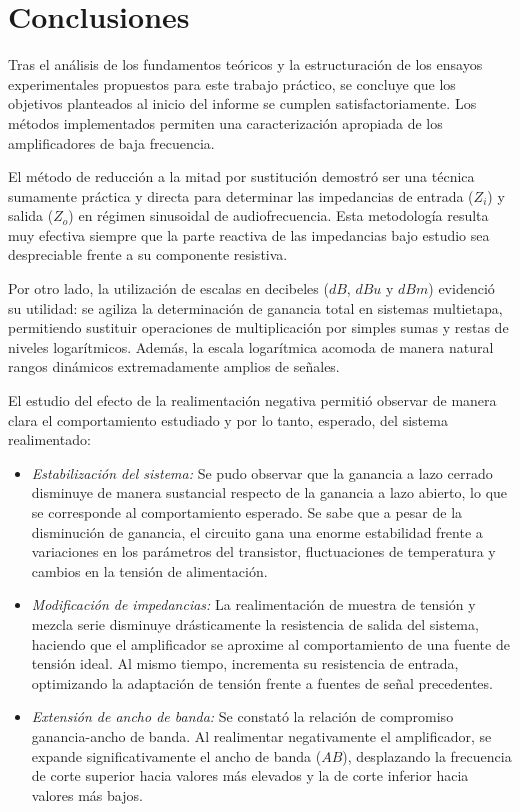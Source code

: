 \chapter{Conclusiones}
\label{chap:conclusiones}

Tras el análisis de los fundamentos teóricos y la estructuración de los ensayos experimentales propuestos para
este trabajo práctico, se concluye que los objetivos planteados al inicio del informe se cumplen satisfactoriamente.
Los métodos implementados permiten una caracterización apropiada de los amplificadores de baja frecuencia.

El método de reducción a la mitad por sustitución demostró ser una técnica sumamente práctica y directa para determinar
las impedancias de entrada ($Z_i$) y salida ($Z_o$) en régimen sinusoidal de audiofrecuencia. Esta metodología resulta
muy efectiva siempre que la parte reactiva de las impedancias bajo estudio sea despreciable frente a su componente resistiva.

Por otro lado, la utilización de escalas en decibeles ($dB$, $dBu$ y $dBm$)
evidenció su utilidad: se agiliza la determinación de ganancia total en sistemas multietapa, permitiendo
sustituir operaciones de multiplicación por simples sumas y restas de niveles logarítmicos. Además, la escala
logarítmica acomoda de manera natural rangos dinámicos extremadamente amplios de
señales.

El estudio del efecto de la realimentación negativa permitió observar de manera
clara el comportamiento estudiado y por lo tanto, esperado, del sistema
realimentado:
\begin{itemize}

    \item \textit{Estabilización del sistema:} Se pudo observar que la ganancia
        a lazo cerrado disminuye de manera sustancial respecto de la ganancia a
        lazo abierto, lo que se corresponde al comportamiento esperado. Se sabe
        que a pesar de la disminución de ganancia, el circuito gana una enorme
        estabilidad frente a variaciones en los parámetros del transistor,
        fluctuaciones de temperatura y cambios en la tensión de alimentación.
    \item \textit{Modificación de impedancias:} La realimentación de muestra de tensión
        y mezcla serie disminuye drásticamente la resistencia de salida del sistema, haciendo
        que el amplificador se aproxime al comportamiento de una fuente de
        tensión ideal. Al mismo tiempo, incrementa su resistencia de entrada,
        optimizando la adaptación de tensión frente a fuentes de señal
        precedentes.
    \item \textit{Extensión de ancho de banda:} Se constató la relación
        de compromiso ganancia-ancho de banda. Al realimentar negativamente el
        amplificador, se expande significativamente el ancho de banda ($AB$),
        desplazando la frecuencia de corte superior hacia valores más elevados y
        la de corte inferior hacia valores más bajos.
    \end{itemize}

